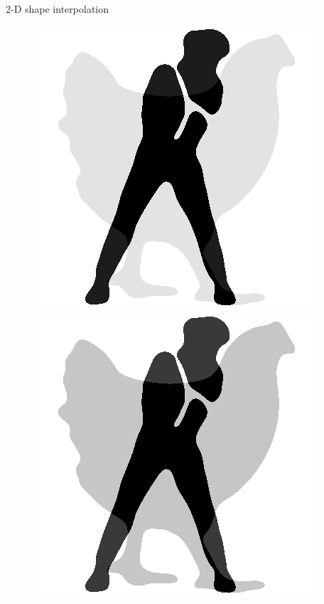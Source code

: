 \begin{frame}{2-D shape interpolation}
\begin{figure}
\begin{minipage}[t]{0.08\linewidth}
            \includegraphics[width=\textwidth]{png/kun-chicken/color1.png}
        \end{minipage}
        \hfill
        \begin{minipage}[t]{0.08\linewidth}
            \vspace{0pt}
            \centering
            \includegraphics[width=\textwidth]{png/kun-chicken/color2.png}

\end{minipage}
\end{figure}
\end{frame}
